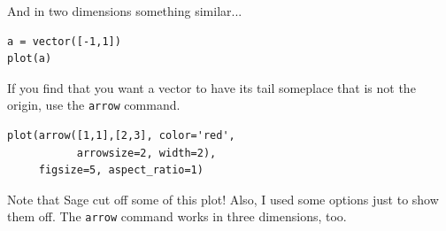 \documentclass[10pt,]{book}
\theoremstyle{plain}
\numberwithin{equation}{section}
\begin{document}
And in two dimensions something similar...%
\begin{lstlisting}[style=sageinput]
a = vector([-1,1])
plot(a)
\end{lstlisting}
\par
If you find that you want a vector to have its tail someplace
              that is not the origin, use the \verb?arrow? command.%
\begin{lstlisting}[style=sageinput]
plot(arrow([1,1],[2,3], color='red',
           arrowsize=2, width=2),
     figsize=5, aspect_ratio=1)
\end{lstlisting}
\par
Note that Sage cut off some of this plot! Also, I used some options
              just to show them off. The \verb?arrow? command works in three dimensions,
              too.
\typeout{************************************************}
\typeout{************************************************}
\end{document}
